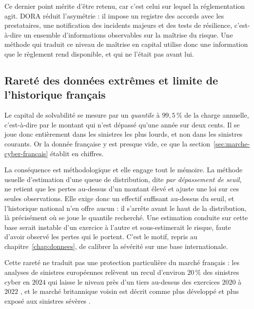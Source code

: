 Ce dernier point mérite d'être retenu, car c'est celui sur lequel la réglementation agit. DORA
réduit l'asymétrie : il impose un registre des accords avec les prestataires, une notification
des incidents majeurs et des tests de résilience, c'est-à-dire un ensemble d'informations
observables sur la maîtrise du risque. Une méthode qui traduit ce niveau de maîtrise en capital
utilise donc une information que le règlement rend disponible, et qui ne l'était pas avant lui.

\subsection{Rareté des données extrêmes et limite de l'historique français}

Le capital de solvabilité se mesure par un \emph{quantile} à $99{,}5\,\%$ de la charge annuelle,
c'est-à-dire par le montant qui n'est dépassé qu'une année sur deux cents. Il se joue donc
entièrement dans les sinistres les plus lourds, et non dans les sinistres courants. Or la donnée
française y est presque vide, ce que la section~\ref{sec:marche-cyber-francais} établit en
chiffres.

La conséquence est méthodologique et elle engage tout le mémoire. La méthode usuelle d'estimation
d'une queue de distribution, dite \emph{par dépassement de seuil}, ne retient que les pertes
au-dessus d'un montant élevé et ajuste une loi sur ces seules observations. Elle exige donc un
effectif suffisant au-dessus du seuil, et l'historique national n'en offre aucun : il s'arrête
avant le haut de la distribution, là précisément où se joue le quantile recherché. Une estimation
conduite sur cette base serait instable d'un exercice à l'autre et sous-estimerait le risque,
faute d'avoir observé les pertes qui le portent. C'est le motif, repris au
chapitre~\ref{chap:donnees}, de calibrer la sévérité sur une base internationale.

Cette rareté ne traduit pas une protection particulière du marché français : les analyses de
sinistres européennes relèvent un recul d'environ $20\,\%$ des sinistres cyber en $2024$ qui
laisse le niveau près d'un tiers au-dessus des exercices $2020$ à $2022$ \citep{marsh2025}, et le
marché britannique voisin est décrit comme plus développé et plus exposé aux sinistres sévères
\citep{dsit2025}.

